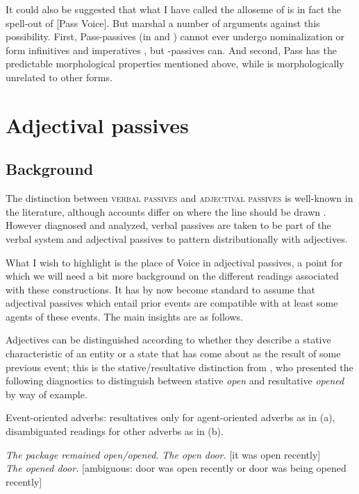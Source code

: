 \begin{exe}
\begin{xlist}
\begin{exe}
\begin{xlist}
\begin{exe}
\begin{exe}
\begin{xlist}
\begin{exe}
\begin{exe}
\begin{xlist}
\begin{exe}
\begin{xlist}
\begin{exe}
\begin{xlist}
\begin{exe}
\begin{xlist}
\begin{xlist}
It could also be suggested that what I have called the  alloseme of {\vz} is in fact the spell-out of [Pass Voice]. But \cite{ahdoutkastner19nels} marshal a number of arguments against this possibility. First, Pass-passives (in {\tpua} and {\thif}) cannot ever undergo nominalization or form infinitives and imperatives \citep{kastnerzu17}, but {\vz}-passives can. And second, Pass has the predictable morphological properties mentioned above, while {\vz} is morphologically unrelated to other forms.\label{r1:5:4}


\section{Adjectival passives} \label{passn:adjpass}

	\subsection{Background}

The distinction between \textsc{verbal passives} and \textsc{adjectival passives} is well-known in the literature, although accounts differ on where the line should be drawn \citep{wasow77,levinrappaport86,borerwexler87,embick04li,alexiadouetal14,layering15,bruening14nllt}. However diagnosed and analyzed, verbal passives are taken to be part of the verbal system and adjectival passives to pattern distributionally with adjectives.

What I wish to highlight is the place of Voice in adjectival passives, a point for which we will need a bit more background on the different readings associated with these constructions. It has by now become standard to assume that adjectival passives which entail prior events are compatible with at least some agents of these events. The main insights are as follows.

Adjectives can be distinguished according to whether they describe a stative characteristic of an entity or a state that has come about as the result of some previous event; this is the stative/resultative distinction from \cite{embick04li}, who presented the following diagnostics to distinguish between stative \emph{open} and resultative \emph{opened} by way of example.
 \begin{exe}
 \ex  Event-oriented adverbs: resultatives only for agent-oriented adverbs as in (a), disambiguated readings for other adverbs as in (b). 
	 \begin{xlist} 
 	\ex  \emph{The package remained  \xmark open/\cmark opened.} 
 	\ex  \emph{The  open door.} [it was open recently] \\
		\emph{The  opened door.} [ambiguous: door was open recently or door was being opened recently]
	 \z


\end{xlist}
\end{exe}
\end{xlist}
\end{xlist}
\end{exe}
\end{xlist}
\end{exe}
\end{xlist}
\end{exe}
\end{xlist}
\end{exe}
\end{exe}
\end{xlist}
\end{exe}
\end{exe}
\end{xlist}
\end{exe}
\end{xlist}
\end{exe}
